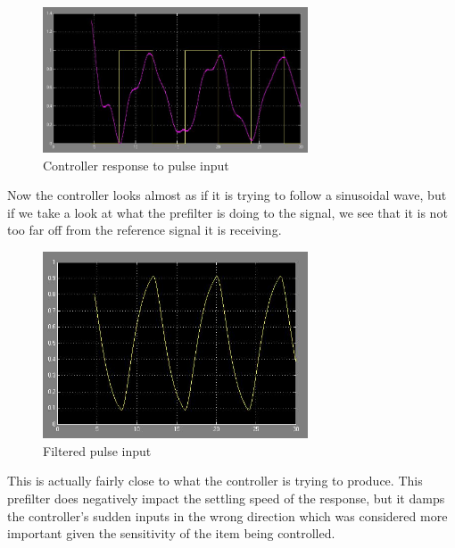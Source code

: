 \begin{figure}[h!t]
	\centering
		\includegraphics[width=0.70\textwidth]{pics/pulseresponse}
	\caption{Controller response to pulse input}
	\label{3:fig:pulseresponse}
\end{figure}
\FloatBarrier

Now the controller looks almost as if it is trying to follow a sinusoidal wave, but if we take a look at what the prefilter is doing to the signal, we see that it is not too far off from the reference signal it is receiving.

\begin{figure}[h!t]
	\centering
		\includegraphics[width=0.70\textwidth]{pics/lowpasspulse}
	\caption{Filtered pulse input}
	\label{3:fig:lowpasspulse}
\end{figure}
\FloatBarrier

This is actually fairly close to what the controller is trying to produce. This prefilter does negatively impact the settling speed of the response, but it damps the controller's sudden inputs in the wrong direction which was considered more important given the sensitivity of the item being controlled.


